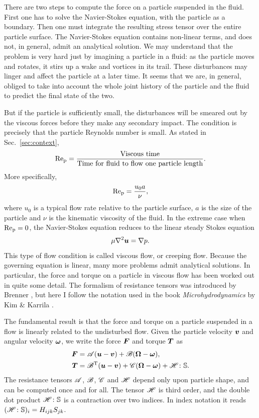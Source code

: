 \documentclass[thesis.tex]{subfiles}
\begin{document}
There are two steps to compute the force on a particle suspended in the fluid. First one has to solve the Navier-Stokes equation, with the particle as a boundary. Then one must integrate the resulting stress tensor over the entire particle surface. The Navier-Stokes equation  contains non-linear terms, and does not, in general, admit an analytical solution. We may understand that the problem is very hard just by imagining a particle in a fluid: as the particle moves and rotates, it stirs up a wake and vortices in its trail. These disturbances may linger and affect the particle at a later time. It seems that we are, in general, obliged to take into account the whole joint history of the particle and the fluid to predict the final state of the two.

But if the particle is sufficiently small, the disturbances will be smeared out by the viscous forces before they make any secondary impact. The condition is precisely that the particle Reynolds number is small. As stated in Sec.~\ref{sec:context},
\begin{align*}
 	\mbox{Re}_{\mathrm p} = \frac{\textrm{Viscous time}}{\textrm{Time for fluid to flow one particle length}}.
\end{align*}
More specifically,
\begin{align*}
	\mbox{Re}_{\mathrm p} = \frac{u_0 a}{\nu},
\end{align*}
where $u_0$ is a typical flow rate relative to the particle surface, $a$ is the size of the particle and $\nu$ is the kinematic viscosity of the fluid. In the extreme case when $\mbox{Re}_{\mathrm p}=0$, the Navier-Stokes equation  reduces to the linear steady Stokes equation \cite{kim1991,kundu2004}
\begin{align*}
	\mu \nabla^2 \mbox{\boldmath$u$} = \nabla p.
\end{align*}
This type of flow condition is called viscous flow, or creeping flow. Because the governing equation is linear, many more problems admit analytical solutions. In particular, the force and torque on a particle in viscous flow has been worked out in quite some detail. The formalism of resistance tensors was introduced by Brenner \cite{brenner1974, happel1965}, but here I follow the notation used in the book \emph{Microhydrodynamics} by Kim \& Karrila \cite{kim1991}.

The fundamental result is that the force and torque on a particle suspended in a flow is linearly related to the undisturbed flow. Given the particle velocity $\mbox{\boldmath$v$}$ and angular velocity $\mbox{\boldmath$\omega$}$, we write the force $\mbox{\boldmath$F$}$ and torque $\mbox{\boldmath$T$}$ as
\begin{align}
	\ve F &= \te A (\ve u - \ve v) + \te B (\ve \Omega - \ve \omega), \nn \\
	\ve T &= \te B\transpose (\ve u - \ve v) + \te C (\ve \Omega - \ve \omega) + \te H \dd \ma S. \eqnlab{resistanceformulation}
\end{align}
The resistance tensors $\mathscr{A}$, $\mathscr{B}$, $\mathscr{C}$ and $\mathscr{H}$ depend only upon particle shape, and can be computed once and for all. The tensor $\mathscr{H}$ is third order, and the double dot product $\mathscr{H} \colon \mathbb{S}$ is a contraction over two indices. In index notation it reads $(\mathscr{H} \colon \mathbb{S})_i = H_{ijk}S_{jk}$. 
\end{document}
